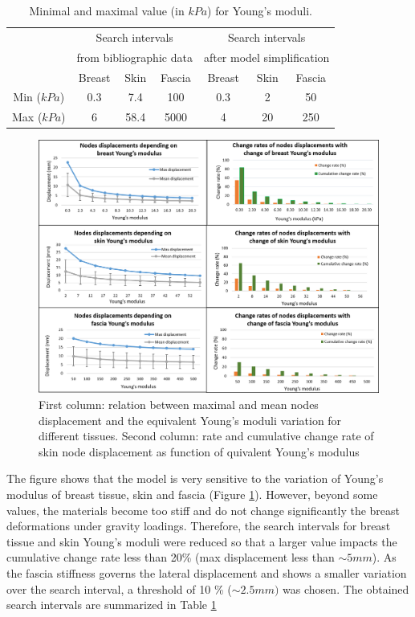 \begin{table}[!h]
\centering
\begin{tabular}{|c||c|c|c||c|c|c|}
\hline
&\multicolumn{3}{|c||}{Search intervals}& \multicolumn{3}{c|}{Search intervals}\\
&\multicolumn{3}{|c||}{ from bibliographic data}& \multicolumn{3}{c|}{ after model simplification}\\
\hline
\hline
& Breast & Skin & Fascia & Breast & Skin & Fascia \\
\hline
Min ($kPa$)  & 0.3 & 7.4 & 100 & 0.3 & 2 & 50\\
\hline
Max ($kPa$) & 6 & 58.4 & 5000& 4& 20 &250 \\
\hline
\end{tabular}
\caption{Minimal and maximal value (in $kPa$) for Young's moduli.}
\label{table:minandmaxelasticmodulus}
\end{table}

\begin{figure}[!h]
\centering
\includegraphics[width=\textwidth,keepaspectratio]{figures/materialPropDiscretization.png} 
\caption{First column: relation between maximal and mean nodes displacement and the equivalent Young's moduli variation for different tissues. Second column: rate and cumulative change rate of skin node displacement as function of quivalent Young's modulus}\label{fig:materialPropDiscretization}
\end{figure}

The figure shows that the model is very sensitive to the variation of Young’s modulus of breast tissue, skin and fascia (Figure \ref{fig:materialPropDiscretization}). However, beyond some values, the materials become too stiff and do not change significantly the breast deformations under gravity loadings.  Therefore, the search intervals for breast tissue and skin Young's moduli were reduced so that a larger value impacts the cumulative change rate less than 20\% (max displacement less than $\sim 5mm$). As the fascia stiffness governs the lateral displacement and shows a smaller variation over the search interval, a threshold of 10 \% ($\sim 2.5mm)$ was chosen. The obtained search intervals are summarized in Table \ref{table:minandmaxelasticmodulus} 



